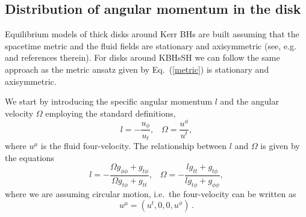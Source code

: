 \documentclass[twocolumn,aps,showpacs,showkeys,prd,superscriptaddress,byrevtex, amsmath]{revtex4-1}
\begin{document}
\subsection{Distribution of angular momentum in the disk}

Equilibrium models of thick disks around Kerr BHs are built assuming that the spacetime metric and the fluid fields are stationary and  axisymmetric (see, e.g.~\cite{Font:2002,Daigne:2004,Gimeno-Soler:2017} and references therein). For disks around KBHsSH we can follow the same approach as the metric ansatz given by Eq.~(\ref{metric}) is stationary and axisymmetric.


We start by introducing the specific angular momentum $l$ and the angular velocity $\Omega$ employing the standard definitions,
\begin{equation}
l = - \frac{u_{\phi}}{u_t}, \;\;\; \Omega = \frac{u^{\phi}}{u^t},
\end{equation}
where $u^{\mu}$ is the fluid four-velocity.
The relationship between $l$ and $\Omega$ is given by the equations
\begin{equation}
l = - \frac{\Omega g_{\phi\phi} + g_{t\phi}}{\Omega g_{t\phi} + g_{tt}}, \;\;\; \Omega = - \frac{l g_{tt} + g_{t\phi}}{l g_{t\phi} + g_{\phi\phi}},
\end{equation}
where we are assuming circular motion, i.e.~the four-velocity can be written as
\begin{equation}
u^{\mu} = (u^t, 0, 0, u^{\phi})\,.
\end{equation}
\end{document}
